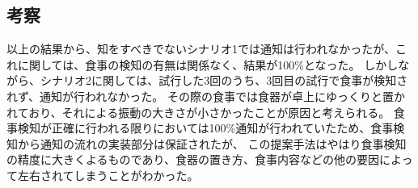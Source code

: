 

\subsection{考察}

以上の結果から、知をすべきでないシナリオ1では通知は行われなかったが、これに関しては、食事の検知の有無は関係なく、結果が100\%となった。
しかしながら、シナリオ2に関しては、試行した3回のうち、3回目の試行で食事が検知されず、通知が行われなかった。
その際の食事では食器が卓上にゆっくりと置かれており、それによる振動の大きさが小さかったことが原因と考えられる。
食事検知が正確に行われる限りにおいては100\%通知が行われていたため、食事検知から通知の流れの実装部分は保証されたが、
この提案手法はやはり食事検知の精度に大きくよるものであり、食器の置き方、食事内容などの他の要因によって左右されてしまうことがわかった。


